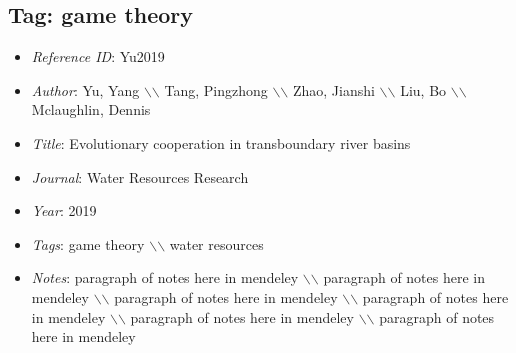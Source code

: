 \documentclass[11pt]{article}
\begin{document}
\subsection{Tag: game theory} 
\noindent\citep{Yu2019} 
\begin{itemize} 
\item{\textit{Reference ID}:  Yu2019} 

\item{\textit{Author}:  Yu, Yang $\backslash$$\backslash$ Tang, Pingzhong $\backslash$$\backslash$ Zhao, Jianshi $\backslash$$\backslash$ Liu, Bo $\backslash$$\backslash$ Mclaughlin, Dennis} 

\item{\textit{Title}:  Evolutionary cooperation in transboundary river basins} 

\item{\textit{Journal}:  Water Resources Research} 

\item{\textit{Year}:  2019} 

\item{\textit{Tags}:  game theory $\backslash$$\backslash$ water resources} 

\item{\textit{Notes}:  paragraph of notes here in mendeley $\backslash$$\backslash$ paragraph of notes here in mendeley $\backslash$$\backslash$ paragraph of notes here in mendeley $\backslash$$\backslash$ paragraph of notes here in mendeley $\backslash$$\backslash$ paragraph of notes here in mendeley $\backslash$$\backslash$ paragraph of notes here in mendeley} 

\end{itemize}\medskip
\end{document}

